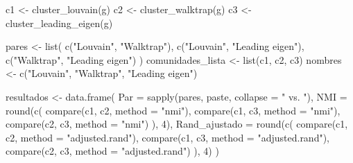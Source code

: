 \documentclass[
  letterpaper,
  DIV=11,
  numbers=noendperiod]{scrreprt}
\newenvironment{Shaded}{\begin{snugshade}}{\end{snugshade}}
\newcommand{\AttributeTok}[1]{\textcolor[rgb]{0.40,0.45,0.13}{#1}}
\newcommand{\DecValTok}[1]{\textcolor[rgb]{0.68,0.00,0.00}{#1}}
\newcommand{\FunctionTok}[1]{\textcolor[rgb]{0.28,0.35,0.67}{#1}}
\newcommand{\NormalTok}[1]{\textcolor[rgb]{0.00,0.23,0.31}{#1}}
\newcommand{\OtherTok}[1]{\textcolor[rgb]{0.00,0.23,0.31}{#1}}
\newcommand{\StringTok}[1]{\textcolor[rgb]{0.13,0.47,0.30}{#1}}
\begin{document}
\begin{tcolorbox}[enhanced jigsaw, toprule=.15mm, colframe=quarto-callout-tip-color-frame, coltitle=black, titlerule=0mm, colback=white, breakable, leftrule=.75mm, arc=.35mm, bottomtitle=1mm, toptitle=1mm, rightrule=.15mm, bottomrule=.15mm, left=2mm, title=\textcolor{quarto-callout-tip-color}{\faLightbulb}\hspace{0.5em}{📝 Solución}, colbacktitle=quarto-callout-tip-color!10!white, opacityback=0, opacitybacktitle=0.6]

\begin{Shaded}
\begin{Highlighting}[]
\NormalTok{c1 }\OtherTok{\textless{}{-}} \FunctionTok{cluster\_louvain}\NormalTok{(g)}
\NormalTok{c2 }\OtherTok{\textless{}{-}} \FunctionTok{cluster\_walktrap}\NormalTok{(g)}
\NormalTok{c3 }\OtherTok{\textless{}{-}} \FunctionTok{cluster\_leading\_eigen}\NormalTok{(g)}

\NormalTok{pares }\OtherTok{\textless{}{-}} \FunctionTok{list}\NormalTok{(}
  \FunctionTok{c}\NormalTok{(}\StringTok{"Louvain"}\NormalTok{, }\StringTok{"Walktrap"}\NormalTok{),}
  \FunctionTok{c}\NormalTok{(}\StringTok{"Louvain"}\NormalTok{, }\StringTok{"Leading eigen"}\NormalTok{),}
  \FunctionTok{c}\NormalTok{(}\StringTok{"Walktrap"}\NormalTok{, }\StringTok{"Leading eigen"}\NormalTok{)}
\NormalTok{)}
\NormalTok{comunidades\_lista }\OtherTok{\textless{}{-}} \FunctionTok{list}\NormalTok{(c1, c2, c3)}
\NormalTok{nombres }\OtherTok{\textless{}{-}} \FunctionTok{c}\NormalTok{(}\StringTok{"Louvain"}\NormalTok{, }\StringTok{"Walktrap"}\NormalTok{, }\StringTok{"Leading eigen"}\NormalTok{)}

\NormalTok{resultados }\OtherTok{\textless{}{-}} \FunctionTok{data.frame}\NormalTok{(}
  \AttributeTok{Par =} \FunctionTok{sapply}\NormalTok{(pares, paste, }\AttributeTok{collapse =} \StringTok{" vs. "}\NormalTok{),}
  \AttributeTok{NMI =} \FunctionTok{round}\NormalTok{(}\FunctionTok{c}\NormalTok{(}
    \FunctionTok{compare}\NormalTok{(c1, c2, }\AttributeTok{method =} \StringTok{"nmi"}\NormalTok{),}
    \FunctionTok{compare}\NormalTok{(c1, c3, }\AttributeTok{method =} \StringTok{"nmi"}\NormalTok{),}
    \FunctionTok{compare}\NormalTok{(c2, c3, }\AttributeTok{method =} \StringTok{"nmi"}\NormalTok{)}
\NormalTok{  ), }\DecValTok{4}\NormalTok{),}
  \AttributeTok{Rand\_ajustado =} \FunctionTok{round}\NormalTok{(}\FunctionTok{c}\NormalTok{(}
    \FunctionTok{compare}\NormalTok{(c1, c2, }\AttributeTok{method =} \StringTok{"adjusted.rand"}\NormalTok{),}
    \FunctionTok{compare}\NormalTok{(c1, c3, }\AttributeTok{method =} \StringTok{"adjusted.rand"}\NormalTok{),}
    \FunctionTok{compare}\NormalTok{(c2, c3, }\AttributeTok{method =} \StringTok{"adjusted.rand"}\NormalTok{)}
\NormalTok{  ), }\DecValTok{4}\NormalTok{)}
\NormalTok{)}


\end{Highlighting}
\end{Shaded}
\end{tcolorbox}
\end{document}
